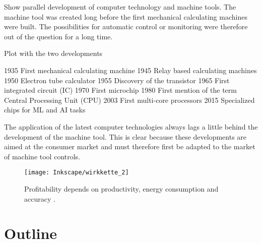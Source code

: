 Show parallel development of computer technology and machine tools. The machine tool was created long before the first mechanical calculating machines were built. The possibilities for automatic control or monitoring were therefore out of the question for a long time. 

Plot with the two developments

1935 First mechanical calculating machine
1945 Relay based calculating machines
1950 Electron tube calculator
1955 Discovery of the transistor
1965 First integrated circuit (IC)
1970 First microchip
1980 First mention of the term Central Processing Unit (CPU)
2003 First multi-core processors
2015 Specialized chips for ML and AI tasks

The application of the latest computer technologies always lags a little behind the development of the machine tool. This is clear because these developments are aimed at the consumer market and must therefore first be adapted to the market of machine tool controls. 


\begin{figure}[!htb]
    \centering
    \texttt{[image: Inkscape/wirkkette\_2]} %
    \caption[Economic and technical relationships]{Profitability depends on productivity, energy consumption and accuracy \cite{Weber2015}.}
    \label{fig:prf_accuracy}
\end{figure}
 



\section{Outline} %
\label{sec:outline}

